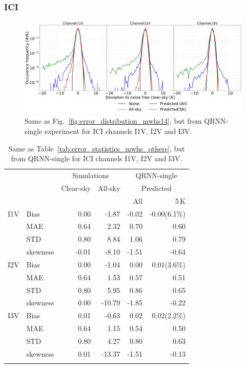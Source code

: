 \documentclass[amt, manuscript]{copernicus}
\begin{document}
\subsubsection{ICI}
%
\begin{figure}[t]
	\includegraphics[width=\textwidth]{Figures/error_distribution_QRNN-single.pdf} 
	\caption{Same as Fig.~\ref{fig:error_distribution_mwhs14}, but from QRNN-single experiment for ICI channels I1V, I2V and I3V.}
	\label{fig:error_distributions}	
\end{figure}
\begin{table}[t]
	\caption{ Same as Table~\ref{tab:error_statistics_mwhs_others}, but from QRNN-single for ICI channels I1V, I2V and I3V.}
	\label{tab:error_statistics_ici}
	\begin{tabular}{llrr|rr}
		\tophline
		&&\multicolumn{2}{c|}{Simulations}& \multicolumn{2}{c}{QRNN-single} \\
		\cline{3-6}
		&&Clear-sky &   All-sky &  \multicolumn{2}{c}{Predicted}  \\
		&&			   &			&	All & 5\,K \\
		\middlehline
		
		I1V&  Bias      &  0.00 & -1.87 & -0.02 & -0.00(6.1\%)  \\
		&MAE       		&  0.64 &  2.32 &  0.70 &  0.60   \\
		&STD       		&  0.80 &  8.84 &  1.06 &  0.79   \\
		&skewness 		& -0.01 & -8.10 & -1.51 & -0.64  \\
		\middlehline
		I2V & Bias      & 0.00 &  -1.04 &  0.00 &  0.01(3.6\%)  \\
		&MAE       		& 0.64 &   1.53 &  0.57 &  0.51 \\
		&STD       		& 0.80 &   5.95 &  0.86 &  0.65 \\
		&skewness 		& 0.00 & -10.79 & -1.85 & -0.22  \\
		\middlehline	
		I3V & Bias      & 0.01 &  -0.63 &  0.02 &  0.02(2.2\%)  \\
		&MAE       		& 0.64 &   1.15 &  0.54 &  0.50  \\
		&STD       		& 0.80 &   4.27 &  0.80 &  0.63  \\
		&skewness 		& 0.01 & -13.37 & -1.51 & -0.13  \\
		\bottomhline
	\end{tabular}
	\belowtable{} %
\end{table}
\end{document}
